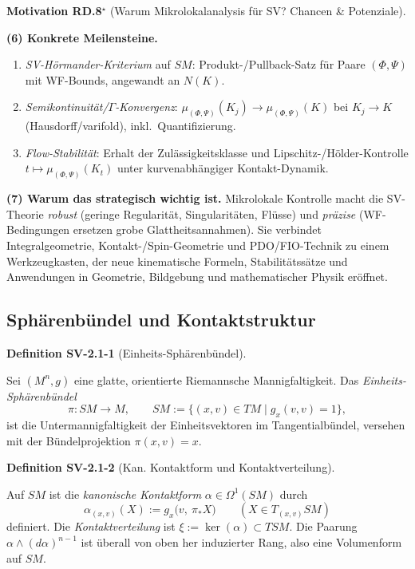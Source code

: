 \documentclass[10pt, letterpaper]{article}
\newcommand{\CustomHeading}[3]{%
  \par\medskip\noindent%
  \textbf{#1 #2} \textnormal{(#3)}.\enskip%
}
\newenvironment{DEF}[2]{\begin{unitbox}\CustomHeading{Definition}{#1}{#2}}{\end{unitbox}}
\newenvironment{MOT}[2]{\begin{unitbox}\CustomHeading{Motivation}{#1}{#2}}{\end{unitbox}}
\begin{document}
\begin{MOT}{RD.8$^\star$}{Warum Mikrolokalanalysis für SV? Chancen \& Potenziale}
\medskip\noindent
\textbf{(6) Konkrete Meilensteine.}
\begin{enumerate}[label=(\roman*)]
  \item \emph{SV-Hörmander-Kriterium} auf $SM$: Produkt-/Pullback-Satz für Paare $(\Phi,\Psi)$ mit WF-Bounds, angewandt an $N(K)$.
  \item \emph{Semikontinuität/$\Gamma$-Konvergenz}: $\mu_{(\Phi,\Psi)}(K_j)\to \mu_{(\Phi,\Psi)}(K)$ bei $K_j\to K$ (Hausdorff/varifold), inkl.\ Quantifizierung.
  \item \emph{Flow-Stabilität}: Erhalt der Zulässigkeitsklasse und Lipschitz-/Hölder-Kontrolle $t\mapsto \mu_{(\Phi,\Psi)}(K_t)$ unter kurvenabhängiger Kontakt-Dynamik.
\end{enumerate}

\medskip\noindent
\textbf{(7) Warum das strategisch wichtig ist.}
Mikrolokale Kontrolle macht die SV-Theorie \emph{robust} (geringe Regularität, Singularitäten, Flüsse) und \emph{präzise} (WF-Bedingungen ersetzen grobe Glattheitsannahmen). Sie verbindet Integralgeometrie, Kontakt-/Spin-Geometrie und PDO/FIO-Technik zu einem Werkzeugkasten, der neue kinematische Formeln, Stabilitätssätze und Anwendungen in Geometrie, Bildgebung und mathematischer Physik eröffnet.

\end{MOT}

\pagebreak

\subsection{Sphärenbündel und Kontaktstruktur}\label{subsec:SV-2.1}

\begin{DEF}{SV-2.1-1}{Einheits-Sphärenbündel}
Sei $(M^n,g)$ eine glatte, orientierte Riemannsche Mannigfaltigkeit. Das \emph{Einheits-Sphärenbündel}
\[
\pi: SM \longrightarrow M,\qquad SM:=\{(x,v)\in TM \mid g_x(v,v)=1\},
\]
ist die Untermannigfaltigkeit der Einheitsvektoren im Tangentialbündel, versehen mit der Bündelprojektion $\pi(x,v)=x$.
\end{DEF}




\begin{DEF}{SV-2.1-2}{Kan. Kontaktform und Kontaktverteilung}
Auf $SM$ ist die \emph{kanonische Kontaktform} $\alpha\in\Omega^1(SM)$ durch
\[
\alpha_{(x,v)}(X):=g_x\big(v,\ \pi_* X\big)\qquad (X\in T_{(x,v)}SM)
\]
definiert. Die \emph{Kontaktverteilung} ist $\xi:=\ker(\alpha)\subset TSM$. Die Paarung
$\alpha\wedge (d\alpha)^{n-1}$ ist überall von oben her induzierter Rang, also eine Volumenform auf $SM$.
\end{DEF}
\end{document}
